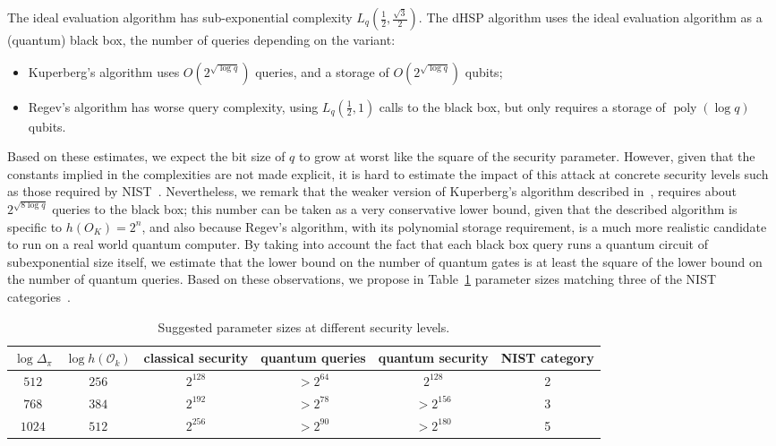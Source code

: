 \documentclass{article}
\renewcommand{\O}{\mathcal{O}}
\theoremstyle{definition}
\DeclareMathOperator{\poly}{poly}
\begin{document}
The ideal evaluation algorithm has sub-exponential complexity
$L_q(\frac{1}{2},\frac{\sqrt{3}}{2})$.  The dHSP algorithm uses the
ideal evaluation algorithm as a (quantum) black box, the number of
queries depending on the variant:
\begin{itemize}
\item Kuperberg's algorithm uses $O(2^{\sqrt{\log q}})$ queries, and a
  storage of $O(2^{\sqrt{\log q}})$ qubits;
\item Regev's algorithm has worse query complexity, using
  $L_q(\frac{1}{2},1)$ calls to the black box, but only requires a
  storage of $\poly(\log q)$ qubits.
\end{itemize}

Based on these estimates, we expect the bit size of $q$ to grow at
worst like the square of the security parameter. However, given that
the constants implied in the complexities are not made explicit, it is
hard to estimate the impact of this attack at concrete security levels
such as those required by NIST~\cite{NIST2016}. Nevertheless, we
remark that the weaker version of Kuperberg's algorithm described
in~\cite[§2.1]{regev04}, requires about $2^{\sqrt{8\log q}}$ queries
to the black box; this number can be taken as a very conservative
lower bound, given that the described algorithm is specific to
$h(O_K)=2^n$, and also because Regev's algorithm, with its polynomial
storage requirement, is a much more realistic candidate to run on a
real world quantum computer. By taking into account the fact that each
black box query runs a quantum circuit of subexponential size itself,
we estimate that the lower bound on the number of quantum gates is at
least the square of the lower bound on the number of quantum
queries. Based on these observations, we propose in
Table~\ref{tab:sizes} parameter sizes matching three of the NIST
categories~\cite{NIST2016}.

\begin{table}
  \renewcommand{\arraystretch}{1.4}
  \centering
  \begin{tabular}{c | c | c | c | c | c}
    $\log Δ_π$ & $\log h(\O_k)$
    & \parbox{10ex}{\centering classical security}
    & \parbox{10ex}{\centering quantum queries}
    & \parbox{10ex}{\centering quantum security}
    & \parbox{10ex}{\centering NIST category}\\
    \hline
    $512$  & $256$ & $2^{128}$ & $> 2^{64}$ & $2^{128}$ & 2\\
    $768$  & $384$ & $2^{192}$ & $> 2^{78}$ & $> 2^{156}$ & 3\\
    $1024$ & $512$ & $2^{256}$ & $> 2^{90}$ & $> 2^{180}$ & 5
  \end{tabular}
  \caption{Suggested parameter sizes at different security levels.}
  \label{tab:sizes}
\end{table}
\end{document}
